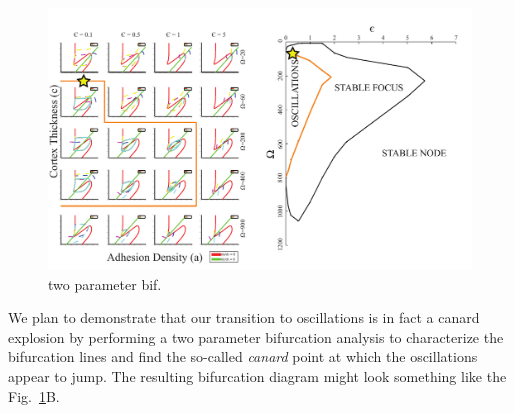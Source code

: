 \begin{figure}[h]
\centering
\captionsetup{width=\linewidth}
\includegraphics[width=7in]{Project2/figs/bifurcationdiagrams.pdf}
\caption{two parameter bif.}
\label{fig::epsomega}
\end{figure}
 
We plan to demonstrate that our transition to oscillations is in fact a canard explosion by performing a two parameter bifurcation analysis to characterize the bifurcation lines and find the so-called {\textit{canard}} point at which the oscillations appear to jump. The resulting bifurcation diagram might look something like the Fig.~\ref{fig::epsomega}B. 


